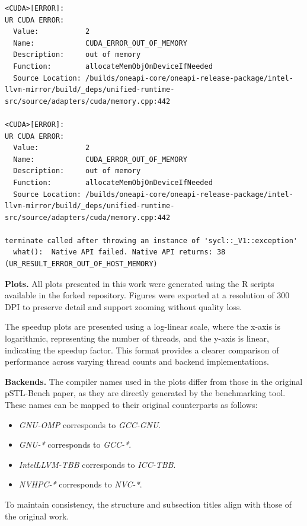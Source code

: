 \documentclass[sigconf]{acmart}
\newcommand{\mypar}[1]{{\bf #1.}}
\begin{document}
\begin{lstlisting}[style=errorlog, caption={oneDPL GPU runtime error output}, label={lst:onedpl-error}]
<CUDA>[ERROR]: 
UR CUDA ERROR:
  Value:           2
  Name:            CUDA_ERROR_OUT_OF_MEMORY
  Description:     out of memory
  Function:        allocateMemObjOnDeviceIfNeeded
  Source Location: /builds/oneapi-core/oneapi-release-package/intel-llvm-mirror/build/_deps/unified-runtime-src/source/adapters/cuda/memory.cpp:442

<CUDA>[ERROR]: 
UR CUDA ERROR:
  Value:           2
  Name:            CUDA_ERROR_OUT_OF_MEMORY
  Description:     out of memory
  Function:        allocateMemObjOnDeviceIfNeeded
  Source Location: /builds/oneapi-core/oneapi-release-package/intel-llvm-mirror/build/_deps/unified-runtime-src/source/adapters/cuda/memory.cpp:442

terminate called after throwing an instance of 'sycl::_V1::exception'
  what():  Native API failed. Native API returns: 38 (UR_RESULT_ERROR_OUT_OF_HOST_MEMORY)
\end{lstlisting}

\mypar{Plots} All plots presented in this work were generated using the R scripts available
in the forked repository. Figures were exported at a resolution of 300 DPI to
preserve detail and support zooming without quality loss.

The speedup plots are presented using a log-linear scale, where the x-axis is
logarithmic, representing the number of threads, and the y-axis is linear,
indicating the speedup factor. This format provides a clearer comparison of
performance across varying thread counts and backend implementations.

\mypar{Backends} The compiler names used in the plots differ from those in the original
pSTL-Bench paper, as they are directly generated by the benchmarking tool.
These names can be mapped to their original counterparts as follows:
\begin{itemize}
      \item \textit{GNU-OMP} corresponds to \textit{GCC-GNU}.
      \item \textit{GNU-*} corresponds to \textit{GCC-*}.
      \item \textit{IntelLLVM-TBB} corresponds to \textit{ICC-TBB}.
      \item \textit{NVHPC-*} corresponds to \textit{NVC-*}.
\end{itemize}

To maintain consistency, the structure and subsection titles align with those
of the original work.
\end{document}
